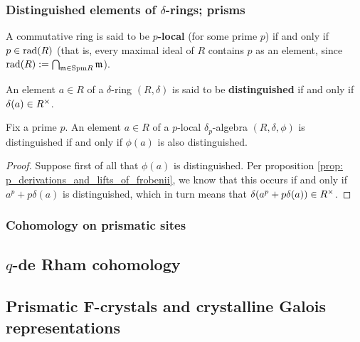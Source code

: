         \subsubsection{Distinguished elements of \texorpdfstring{$\delta$}{}-rings; prisms}
            \begin{definition} \label{def: p_local_rings}
                A commutative ring is said to be \textbf{$p$-local} (for some prime $p$) if and only if $p \in \mathrm{rad}(R)$ (that is, every maximal ideal of $R$ contains $p$ as an element, since $\mathrm{rad}(R) := \bigcap_{\mathfrak{m} \in \mathrm{Spm} R} \mathfrak{m}$).
            \end{definition}
            \begin{definition} \label{def: distinguished_elements_of_delta_rings}
                An element $a \in R$ of a $\delta$-ring $(R, \delta)$ is said to be \textbf{distinguished} if and only if $\delta(a) \in R^{\x}$.
            \end{definition}
            \begin{proposition} \label{prop: detecting_distinguishness_using_lifts_of_frobenii}
                Fix a prime $p$. An element $a \in R$ of a $p$-local $\delta_p$-algebra $(R, \delta, \phi)$ is distinguished if and only if $\phi(a)$ is also distinguished.
            \end{proposition}
                \begin{proof}
                    Suppose first of all that $\phi(a)$ is distinguished. Per proposition \ref{prop: p_derivations_and_lifts_of_frobenii}, we know that this occurs if and only if $a^p + p\delta(a)$ is distinguished, which in turn means that $\delta(a^p + p\delta(a)) \in R^{\x}$.
                \end{proof}
        
        \subsubsection{Cohomology on prismatic sites}
        
    \subsection{\texorpdfstring{$q$}{}-de Rham cohomology}
    
    \subsection{Prismatic F-crystals and crystalline Galois representations}